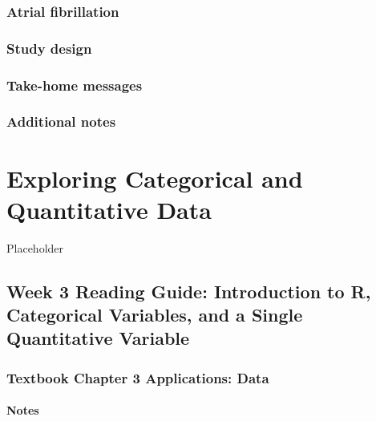 \documentclass[
]{report}
\begin{document}
\hypertarget{atrial-fibrillation}{%
\subsection{Atrial fibrillation}\label{atrial-fibrillation}}

\hypertarget{study-design-2}{%
\subsection{Study design}\label{study-design-2}}

\hypertarget{take-home-messages-3}{%
\subsection{Take-home messages}\label{take-home-messages-3}}

\hypertarget{additional-notes-3}{%
\subsection{Additional notes}\label{additional-notes-3}}

\hypertarget{exploring-categorical-and-quantitative-data}{%
\chapter{Exploring Categorical and Quantitative Data}\label{exploring-categorical-and-quantitative-data}}

Placeholder

\hypertarget{week-3-reading-guide-introduction-to-r-categorical-variables-and-a-single-quantitative-variable}{%
\section{Week 3 Reading Guide: Introduction to R, Categorical Variables, and a Single Quantitative Variable}\label{week-3-reading-guide-introduction-to-r-categorical-variables-and-a-single-quantitative-variable}}

\hypertarget{textbook-chapter-3-applications-data}{%
\subsection*{Textbook Chapter 3 Applications: Data}\label{textbook-chapter-3-applications-data}}

\hypertarget{notes-3}{%
\subsubsection*{Notes}\label{notes-3}}
\end{document}
